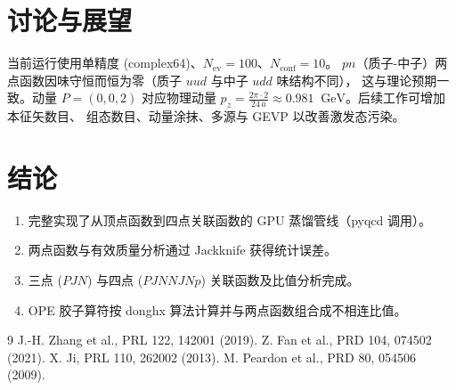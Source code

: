 \documentclass[11pt,a4paper]{article}
\newcommand{\gev}{\;\mathrm{GeV}}
\newcommand{\Nconf}{N_{\mathrm{conf}}}
\newcommand{\Nev}{N_{\mathrm{ev}}}
\begin{document}
\section{讨论与展望}
当前运行使用单精度 (complex64)、$\Nev=100$、$\Nconf=10$。
$pn$（质子-中子）两点函数因味守恒而恒为零（质子 $uud$ 与中子 $udd$ 味结构不同），
这与理论预期一致。动量 $P=(0,0,2)$ 对应物理动量
$p_z = \frac{2\pi\cdot 2}{24\,a}\approx 0.981\;\gev$。后续工作可增加本征矢数目、
组态数目、动量涂抹、多源与 GEVP 以改善激发态污染。

\section{结论}
\begin{enumerate}
    \item 完整实现了从顶点函数到四点关联函数的 GPU 蒸馏管线（pyqcd 调用）。
    \item 两点函数与有效质量分析通过 Jackknife 获得统计误差。
    \item 三点 ($PJN$) 与四点 ($PJNNJNp$) 关联函数及比值分析完成。
    \item OPE 胶子算符按 donghx 算法计算并与两点函数组合成不相连比值。
\end{enumerate}

\begin{thebibliography}{9}
 J.-H. Zhang et al., PRL 122, 142001 (2019).
 Z. Fan et al., PRD 104, 074502 (2021).
 X. Ji, PRL 110, 262002 (2013).
 M. Peardon et al., PRD 80, 054506 (2009).
\end{thebibliography}
\end{document}
